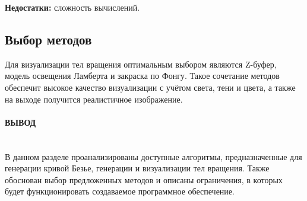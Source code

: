 \textbf{Недостатки:} сложность вычислений.

\subsection{Выбор методов}

Для визуализации тел вращения оптимальным выбором являются Z-буфер, модель освещения Ламберта и закраска по Фонгу. Такое сочетание методов обеспечит высокое качество визуализации с учётом света, тени и цвета, а также на выходе получится реалистичное изображение.

\paragraph*{ВЫВОД} ${}$ \\

В данном разделе проанализированы доступные алгоритмы, предназначенные для генерации кривой Безье, генерации и визуализации тел вращения. Также обоснован выбор предложенных методов и описаны ограничения, в которых будет функционировать создаваемое программное обеспечение.
